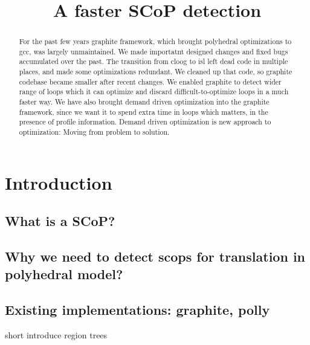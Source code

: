 \documentclass{sigplanconf}
\begin{document}
\setlength{\pdfpageheight}{\paperheight}
\setlength{\pdfpagewidth}{\paperwidth}


\title{A faster SCoP detection}

\maketitle

\begin{abstract}
  For the past few years graphite framework, which brought polyhedral optimizations
  to gcc, was largely unmaintained. We made importatnt designed changes and fixed bugs accumulated over
  the past. The transition from cloog to isl left dead code in multiple places, and made some optimizations
  redundant. We cleaned up that code, so graphite codebase became smaller after recent changes.
  We enabled graphite to detect wider range of loops which it can optimize and discard
  difficult-to-optimize loops in a much faster way. We have also brought demand driven optimization
  into the graphite framework, since we want it to spend extra time in loops which matters,
  in the presence of profile information.
  Demand driven optimization is new approach to optimization: Moving from problem to solution.
\end{abstract}


\section{Introduction}
\subsection{What is a SCoP?}

\subsection{Why we need to detect scops for translation in polyhedral model?}

\subsection{Existing implementations: graphite, polly}
short introduce region trees
\end{document}
